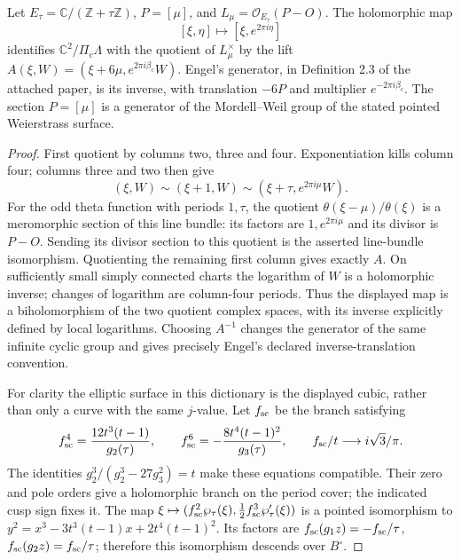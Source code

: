 \begin{proposition}\label{fam:src:B.1.1}\label{fam:st:B.1.1}
Let $E_\tau=\mathbb C/(\mathbb Z+\tau\mathbb Z)$, $P=[\mu]$, and $L_\mu=\mathcal O_{E_\tau}(P-O)$. The holomorphic map
\[
 [\xi,\eta]\longmapsto[\xi,e^{2\pi i\eta}]
\]
identifies $\mathbb C^2/\Pi_c\Lambda$ with the quotient of $L_\mu^\times$ by the lift
$A(\xi,W)=(\xi+6\mu,e^{2\pi i\beta_c}W)$. Engel's generator, in Definition 2.3 of the attached paper, is its inverse, with translation $-6P$ and multiplier $e^{-2\pi i\beta_c}$. The section $P=[\mu]$ is a generator of the Mordell--Weil group of the stated pointed Weierstrass surface.
\end{proposition}
\begin{proof}
First quotient by columns two, three and four. Exponentiation kills column four; columns three and two then give
\[
 (\xi,W)\sim(\xi+1,W)\sim(\xi+\tau,e^{2\pi i\mu}W).
\]
For the odd theta function with periods $1,\tau$, the quotient $\theta(\xi-\mu)/\theta(\xi)$ is a meromorphic section of this line bundle: its factors are $1,e^{2\pi i\mu}$ and its divisor is $P-O$. Sending its divisor section to this quotient is the asserted line-bundle isomorphism. Quotienting the remaining first column gives exactly $A$. On sufficiently small simply connected charts the logarithm of $W$ is a holomorphic inverse; changes of logarithm are column-four periods. Thus the displayed map is a biholomorphism of the two quotient complex spaces, with its inverse explicitly defined by local logarithms. Choosing $A^{-1}$ changes the generator of the same infinite cyclic group and gives precisely Engel's declared inverse-translation convention.

For clarity the elliptic surface in this dictionary is the displayed cubic, rather than only a curve with the same $j$-value. Let $f_{\rm sc}$ be the branch satisfying
\[
 f_{\rm sc}^4=\frac{12t^3(t-1)}{g_2(\tau)},\qquad
 f_{\rm sc}^6=-\frac{8t^4(t-1)^2}{g_3(\tau)},\qquad
 f_{\rm sc}/t\longrightarrow i\sqrt3/\pi.
\]
The identities $g_2^3/(g_2^3-27g_3^2)=t$ make these equations compatible. Their zero and pole orders give a holomorphic branch on the period cover; the indicated cusp sign fixes it. The map $\xi\mapsto(f_{\rm sc}^2\wp_\tau(\xi),\frac12f_{\rm sc}^3\wp'_\tau(\xi))$ is a pointed isomorphism to
$y^2=x^3-3t^3(t-1)x+2t^4(t-1)^2$. Its factors are $f_{\rm sc}(g_1z)=-f_{\rm sc}/\tau$, $f_{\rm sc}(g_2z)=f_{\rm sc}/\tau$; therefore this isomorphism descends over $B^\circ$.


\end{proof}
